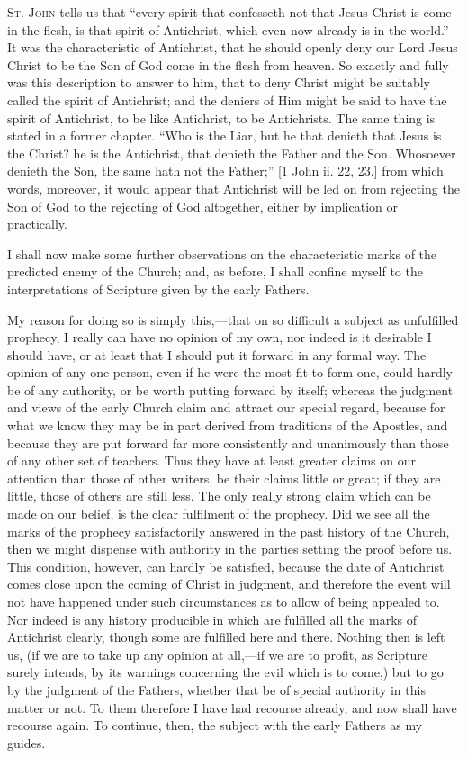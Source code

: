 S\textsc{t}. J\textsc{ohn} tells us that ``every spirit that confesseth not
that Jesus Christ is come in the flesh, is that spirit of Antichrist,
which even now already is in the world.'' It was the
characteristic of Antichrist, that he should openly deny our Lord
Jesus Christ to be the Son of God come in the flesh from heaven. So
exactly and fully was this description to answer to him, that to deny
Christ might be suitably called the spirit of Antichrist; and the
deniers of Him might be said to have the spirit of Antichrist, to be
like Antichrist, to be Antichrists. The same thing is stated in a
former chapter. ``Who is the Liar, but he that denieth that Jesus
is the Christ? he is the Antichrist, that denieth the Father and the
Son. Whosoever denieth the Son, the same hath not the Father;'' [1
John ii. 22, 23.] from which words, moreover, it would appear that
Antichrist will be led on from rejecting the Son of God to the
rejecting of God altogether, either by implication or practically.

I shall now make some further observations on the characteristic
marks of the predicted enemy of the Church; and, as before, I shall
confine myself to the interpretations of Scripture given by the early
Fathers.

My reason for doing so is simply this,—that on so difficult a
subject as unfulfilled prophecy, I really can have no opinion of
my own, nor indeed is it desirable I should have, or at least that I
should put it forward in any formal way. The opinion of any one
person, even if he were the most fit to form one, could hardly be of
any authority, or be worth putting forward by itself; whereas the
judgment and views of the early Church claim and attract our special
regard, because for what we know they may be in part derived from
traditions of the Apostles, and because they are put forward far more
consistently and unanimously than those of any other set of teachers.
Thus they have at least greater claims on our attention than those of
other writers, be their claims little or great; if they are little,
those of others are still less. The only really strong claim which can
be made on our belief, is the clear fulfilment of the prophecy. Did we
see all the marks of the prophecy satisfactorily answered in the past
history of the Church, then we might dispense with authority in the
parties setting the proof before us. This condition, however, can
hardly be satisfied, because the date of Antichrist comes close upon
the coming of Christ in judgment, and therefore the event will not
have happened under such circumstances as to allow of being appealed
to. Nor indeed is any history producible in which are fulfilled all
the marks of Antichrist clearly, though some are fulfilled here and
there. Nothing then is left us, (if we are to take up any opinion at
all,—if we are to profit, as Scripture surely intends, by its
warnings concerning the evil which is to come,) but to go by the
judgment of the Fathers, whether that be of special authority in this
matter or not. To them therefore I have had recourse already, and now
shall have recourse again. To continue, then, the subject with the
early Fathers as my guides.

